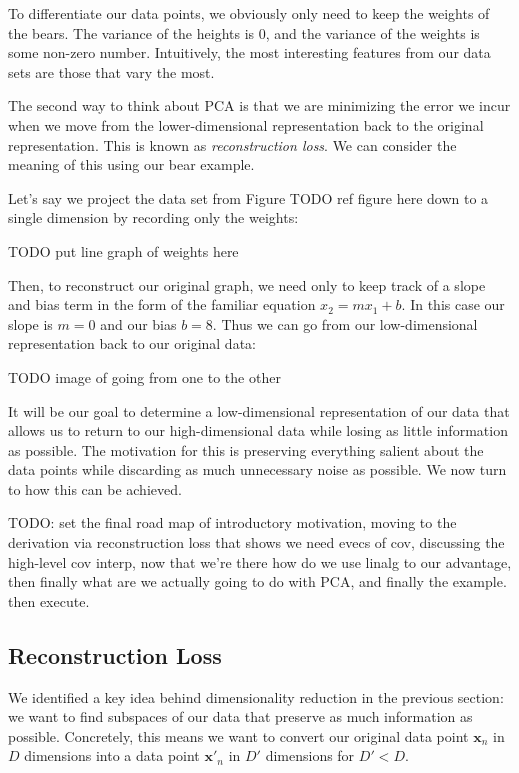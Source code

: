 To differentiate our data points, we obviously only need to keep the weights of the bears. The variance of the heights is 0, and the variance of the weights is some non-zero number. Intuitively, the most interesting features from our data sets are those that vary the most.


The second way to think about PCA is that we are minimizing the error we incur when we move from the lower-dimensional representation back to the original representation. This is known as \textit{reconstruction loss}. We can consider the meaning of this using our bear example.

Let's say we project the data set from Figure TODO ref figure here down to a single dimension by recording only the weights:

TODO put line graph of weights here

Then, to reconstruct our original graph, we need only to keep track of a slope and bias term in the form of the familiar equation $x_2 = mx_1 + b$. In this case our slope is $m=0$ and our bias $b=8$. Thus we can go from our low-dimensional representation back to our original data:

TODO image of going from one to the other

It will be our goal to determine a low-dimensional representation of our data that allows us to return to our high-dimensional data while losing as little information as possible. The motivation for this is preserving everything salient about the data points while discarding as much unnecessary noise as possible. We now turn to how this can be achieved.

TODO: set the final road map of introductory motivation, moving to the derivation via reconstruction loss that shows we need evecs of cov, discussing the high-level cov interp, now that we're there how do we use linalg to our advantage, then finally what are we actually going to do with PCA, and finally the example. then execute.

\subsection{Reconstruction Loss}
We identified a key idea behind dimensionality reduction in the previous section: we want to find subspaces of our data that preserve as much information as possible. Concretely, this means we want to convert our original data point $\textbf{x}_n$ in $D$ dimensions into a data point $\textbf{x}'_{n}$ in $D'$ dimensions for $D' < D$. 

